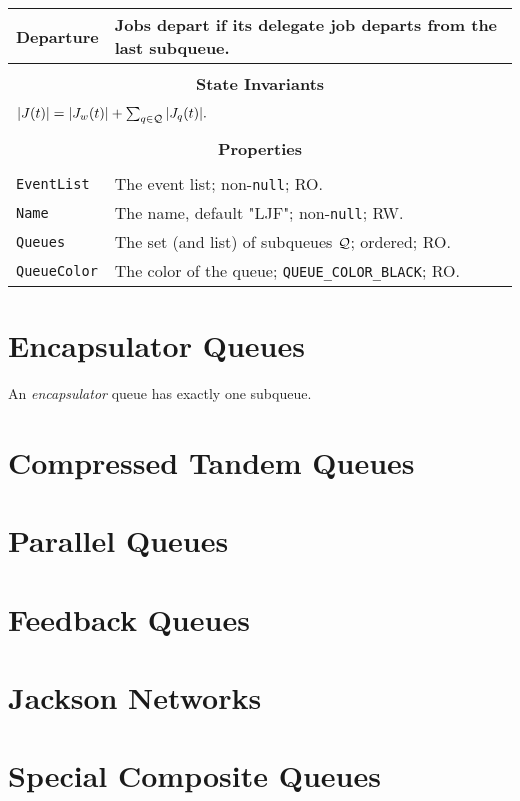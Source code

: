 \documentclass[12pt]{book}
\begin{document}
\begin{tabular}{|l|l|}
\hline
Departure & Jobs depart if its delegate job departs from the last subqueue. \\
\hline
\multicolumn{2}{|c|}{} \\
\multicolumn{2}{|c|}{\bf State  Invariants} \\
\multicolumn{2}{|c|}{} \\
\hline
\multicolumn{2}{|l|}{$|J(t)| = |J_{w}(t)| + \sum_{q \in \cal{Q}} |J_{q}(t)|.$} \\
\hline
\multicolumn{2}{|c|}{} \\
\multicolumn{2}{|c|}{\bf Properties} \\
\multicolumn{2}{|c|}{} \\
\hline
\lstinline|EventList|  & The event list; non-\lstinline|null|; RO. \\
\hline
\lstinline|Name|       & The name, default "LJF"; non-\lstinline|null|; RW. \\
\hline
\lstinline|Queues|     & The set (and list) of subqueues $\cal{Q}$; ordered; RO. \\
\hline
\lstinline|QueueColor| & The color of the queue; \lstinline|QUEUE_COLOR_BLACK|; RO. \\
\hline
\end{tabular}

\section{Encapsulator Queues}

An {\em encapsulator\/} queue has exactly one subqueue.

\section{Compressed Tandem Queues}

\section{Parallel Queues}

\section{Feedback Queues}

\section{Jackson Networks}

\section{Special Composite Queues}
\end{document}
